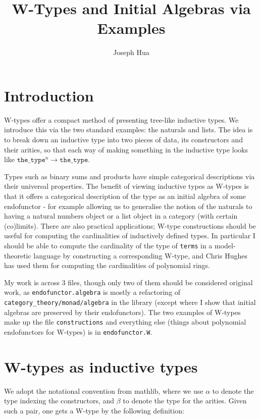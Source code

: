\documentclass{article}
\newcommand{\al}{\alpha}
\newcommand{\be}{\beta}
\newcommand{\<}{\langle}
\renewcommand{\>}{\rangle}
\theoremstyle{definitionstyle}
\theoremstyle{exercisestyle}
\theoremstyle{remarkstyle}
\begin{document}
\title{W-Types and Initial Algebras via Examples}
\author{Joseph Hua}
\maketitle

\section{Introduction}

W-types offer a compact method of presenting tree-like inductive types.
We introduce this via the two standard examples: the naturals and lists.
The idea is to break down an inductive type into two pieces of data,
its constructors and their arities,
so that each way of making something in the inductive type looks like
$\texttt{the\_type}^{n} \to \texttt{the\_type}$.

Types such as binary sums and products have simple categorical descriptions
via their universal properties.
The benefit of viewing inductive types as W-types is that it offers a
categorical description of the type as an initial algebra of some endofunctor
- for example allowing us to generalise the notion of the naturals to having a
natural numbers object or a list object in a category (with certain (co)limits).
There are also practical applications;
W-type constructions should be useful for computing the cardinalities
of inductively defined types.
In particular I should be able to compute the cardinality of
the type of \texttt{terms} in a model-theoretic language by
constructing a corresponding W-type, and
Chris Hughes has used them for computing the cardinalities of polynomial rings.

My work is across 3 files, though only two of them should be considered
original work, as \texttt{endofunctor.algebra} is mostly a refactoring
of \texttt{category\_theory/monad/algebra} in the library
(except where I show that initial algebras are preserved by their endofunctors).
The two examples of W-types make up the file \texttt{constructions} and
everything else (things about polynomial endofunctors for W-types)
is in \texttt{endofunctor.W}.

\section{W-types as inductive types}

We adopt the notational convention from mathlib, where
we use $\al$ to denote the type indexing the constructors,
and $\be$ to denote the type for the arities.
Given such a pair, one gets a W-type by the following definition:
\end{document}
